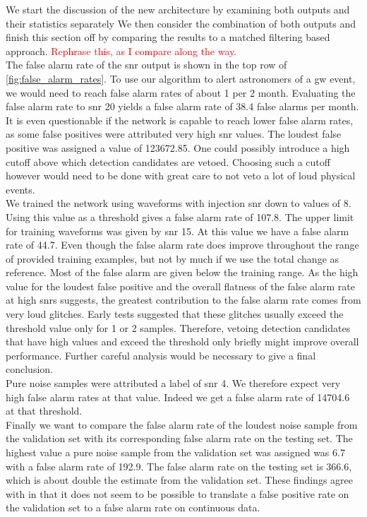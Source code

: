 We start the discussion of the new architecture by examining both outputs and their statistics separately We then consider the combination of both outputs and finish this section off by comparing the results to a matched filtering based approach. \textcolor{red}{Rephrase this, as I compare along the way.}\\
The false alarm rate of the \gls{snr} output is shown in the top row of \autoref{fig:false_alarm_rates}. To use our algorithm to alert astronomers of a \gls{gw} event, we would need to reach false alarm rates of about 1 per 2 month. Evaluating the false alarm rate to \gls{snr} 20 yields a false alarm rate of 38.4 false alarms per month. It is even questionable if the network is capable to reach lower false alarm rates, as some false positives were attributed very high \gls{snr} values. The loudest false positive was assigned a value of 123672.85. One could possibly introduce a high cutoff above which detection candidates are vetoed. Choosing such a cutoff however would need to be done with great care to not veto a lot of loud physical events.\\
We trained the network using waveforms with injection \gls{snr} down to values of $8$. Using this value as a threshold gives a false alarm rate of 107.8. The upper limit for training waveforms was given by \gls{snr} 15. At this value we have a false alarm rate of 44.7. Even though the false alarm rate does improve throughout the range of provided training examples, but not by much if we use the total change as reference. Most of the false alarm are given below the training range. As the high value for the loudest false positive and the overall flatness of the false alarm rate at high \gls{snr}s suggests, the greatest contribution to the false alarm rate comes from very loud glitches. Early tests suggested that these glitches usually exceed the threshold value only for 1 or 2 samples. Therefore, vetoing detection candidates that have high values and exceed the threshold only briefly might improve overall performance. Further careful analysis would be necessary to give a final conclusion.\\
Pure noise samples were attributed a label of \gls{snr} 4. We therefore expect very high false alarm rates at that value. Indeed we get a false alarm rate of 14704.6 at that threshold.\\
Finally we want to compare the false alarm rate of the loudest noise sample from the validation set with its corresponding false alarm rate on the testing set. The highest value a pure noise sample from the validation set was assigned was 6.7 with a false alarm rate of 192.9. The false alarm rate on the testing set is 366.6, which is about double the estimate from the validation set. These findings agree with \cite{cnn_magiacal_bullet} in that it does not seem to be possible to translate a false positive rate on the validation set to a false alarm rate on continuous data.\smallskip\\
